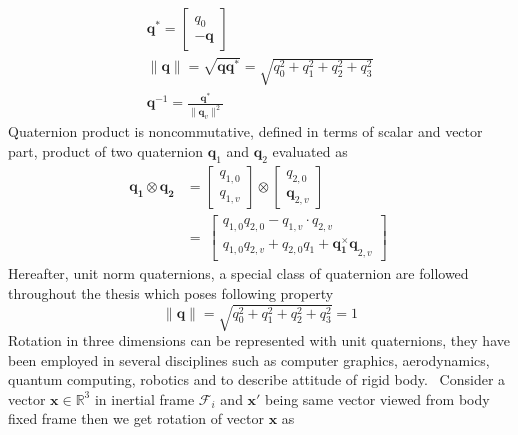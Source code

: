 \begin{gather}
\mathbf{q}^{*} =\begin{bmatrix}
q_{0}\\
-\mathbf{q}
\end{bmatrix} \ \\
\| \mathbf{q} \| =\sqrt{\mathbf{qq}^{*}} =\sqrt{q^{2}_{0} +q^{2}_{1} +q^{2}_{2} +q^{2}_{3}}\\
\mathbf{q}^{-1} =\frac{\mathbf{q}^{*}}{\| \mathbf{q}_v \| ^{2}}
\end{gather}
Quaternion product is noncommutative, defined in terms of scalar and vector part, product of two quaternion $\displaystyle \mathbf{q}_{1}$ and $\displaystyle \mathbf{q}_{2}$ evaluated as 
\begin{equation}
\label{quatProduct}
\begin{aligned}
\mathbf{q_{1} \otimes q_{2}} & =\begin{bmatrix}
q_{1,0}\\
q_{1,v}
\end{bmatrix} \otimes \begin{bmatrix}
q_{2,0}\\
{\mathbf{q}_{2,v}}
\end{bmatrix}\\
 & =\ \begin{bmatrix}
q_{1,0} q_{2,0} - q_{1,v} \cdot q_{2,v}\\
q_{1,0} q_{2,v} +q_{2,0} q_{1} +\mathbf{q ^{\times }_{1} q}_{2,v}
\end{bmatrix}
\end{aligned} \ 
\end{equation}
Hereafter, unit norm quaternions, a special class of quaternion are followed throughout the thesis which poses following property
\begin{equation}
\| \mathbf{q} \| =\sqrt{q^{2}_{0} +q^{2}_{1} +q^{2}_{2} +q^{2}_{3}} =1
\end{equation}
Rotation in three dimensions can be represented with unit quaternions, they have been employed in several disciplines such as computer graphics, aerodynamics, quantum computing, robotics and to describe attitude of rigid body. \ Consider a vector $\displaystyle \mathbf{x} \in \mathbb{R}^{3}$ in inertial frame $\displaystyle \mathcal{F}_{i}$ and $\displaystyle \mathbf{x} '$ being same vector viewed from body fixed frame then we get rotation of vector $\displaystyle \mathbf{x}$ as
